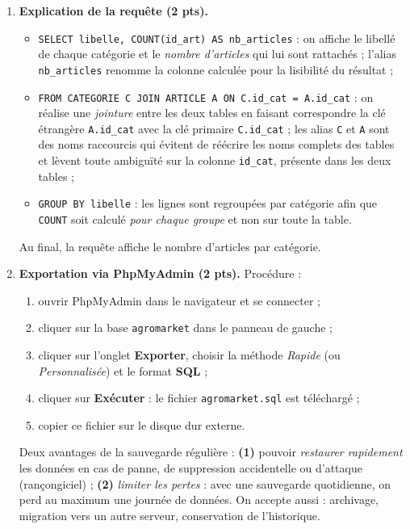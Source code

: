 \documentclass[11pt]{article}
\begin{document}
\begin{corrige}
\begin{enumerate}
\begin{lstlisting}[language=SQL]
CREATE TABLE ARTICLE (
    id_art INT PRIMARY KEY AUTO_INCREMENT,
    designation VARCHAR(80) NOT NULL,
    prix DECIMAL(10,2) DEFAULT 0,
    id_cat INT,
    FOREIGN KEY (id_cat) REFERENCES CATEGORIE(id_cat)
);
\end{lstlisting}
\item \textbf{Explication de la requête (2 pts).}
\begin{itemize}
\item \texttt{SELECT libelle, COUNT(id\_art) AS nb\_articles} : on affiche le libellé de chaque catégorie et le \emph{nombre d'articles} qui lui sont rattachés ; l'alias \texttt{nb\_articles} renomme la colonne calculée pour la lisibilité du résultat ;
\item \texttt{FROM CATEGORIE C JOIN ARTICLE A ON C.id\_cat = A.id\_cat} : on réalise une \emph{jointure} entre les deux tables en faisant correspondre la clé étrangère \texttt{A.id\_cat} avec la clé primaire \texttt{C.id\_cat} ; les alias \texttt{C} et \texttt{A} sont des noms raccourcis qui évitent de réécrire les noms complets des tables et lèvent toute ambiguïté sur la colonne \texttt{id\_cat}, présente dans les deux tables ;
\item \texttt{GROUP BY libelle} : les lignes sont regroupées par catégorie afin que \texttt{COUNT} soit calculé \emph{pour chaque groupe} et non sur toute la table.
\end{itemize}
Au final, la requête affiche le nombre d'articles par catégorie.
\item \textbf{Exportation via PhpMyAdmin (2 pts).} Procédure :
\begin{enumerate}
\item ouvrir PhpMyAdmin dans le navigateur et se connecter ;
\item cliquer sur la base \texttt{agromarket} dans le panneau de gauche ;
\item cliquer sur l'onglet \textbf{Exporter}, choisir la méthode \emph{Rapide} (ou \emph{Personnalisée}) et le format \textbf{SQL} ;
\item cliquer sur \textbf{Exécuter} : le fichier \texttt{agromarket.sql} est téléchargé ;
\item copier ce fichier sur le disque dur externe.
\end{enumerate}
Deux avantages de la sauvegarde régulière : \textbf{(1)} pouvoir \emph{restaurer rapidement} les données en cas de panne, de suppression accidentelle ou d'attaque (rançongiciel) ; \textbf{(2)} \emph{limiter les pertes} : avec une sauvegarde quotidienne, on perd au maximum une journée de données. On accepte aussi : archivage, migration vers un autre serveur, conservation de l'historique.
\end{enumerate}
\end{corrige}
\end{document}
